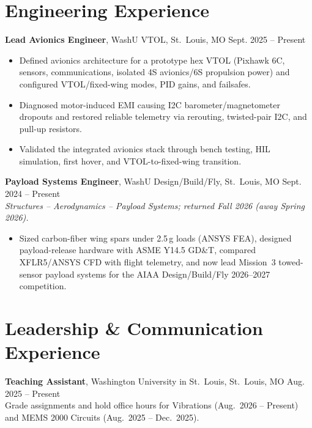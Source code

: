 \documentclass[11pt, letterpaper]{article}
\newcommand{\role}[5]{%
  \noindent\textbf{#1}, #2, #3, #4 \hfill #5%
}
\begin{document}
\section{Engineering Experience}
\role{Lead Avionics Engineer}{WashU VTOL}{St.\ Louis}{MO}{Sept. 2025 -- Present}
\begin{itemize}
\item Defined avionics architecture for a prototype hex VTOL (Pixhawk 6C, sensors, communications, isolated 4S avionics/6S propulsion power) and configured VTOL/fixed-wing modes, PID gains, and failsafes.
\item Diagnosed motor-induced EMI causing I2C barometer/magnetometer dropouts and restored reliable telemetry via rerouting, twisted-pair I2C, and pull-up resistors.
\item Validated the integrated avionics stack through bench testing, HIL simulation, first hover, and VTOL-to-fixed-wing transition.
\end{itemize}
\role{Payload Systems Engineer}{WashU Design/Build/Fly}{St.\ Louis}{MO}{Sept. 2024 -- Present} \\[-2pt]
\textit{\small Structures -- Aerodynamics -- Payload Systems; returned Fall 2026 (away Spring 2026).}
\begin{itemize}
\item Sized carbon-fiber wing spars under 2.5\,g loads (ANSYS FEA), designed payload-release hardware with ASME Y14.5 GD\&T, compared XFLR5/ANSYS CFD with flight telemetry, and now lead Mission~3 towed-sensor payload systems for the AIAA Design/Build/Fly 2026--2027 competition.
\end{itemize}
\section{Leadership \& Communication Experience}
\role{Teaching Assistant}{Washington University in St.\ Louis}{St.\ Louis}{MO}{Aug. 2025 -- Present}\\[-1pt]
{\small Grade assignments and hold office hours for Vibrations (Aug.\ 2026 -- Present) and MEMS 2000 Circuits (Aug.\ 2025 -- Dec.\ 2025).}
\end{document}
